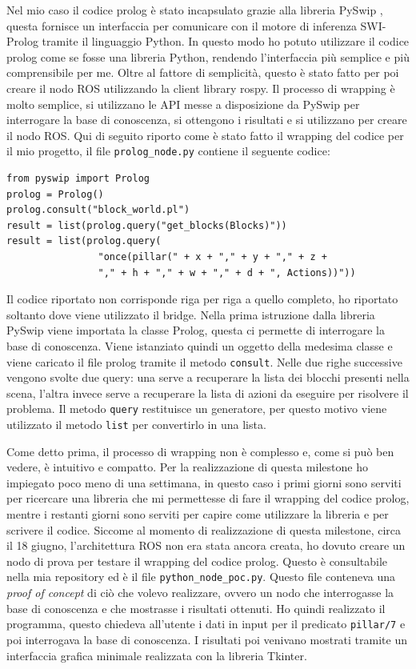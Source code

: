 Nel mio caso il codice prolog è stato incapsulato grazie alla libreria PySwip \cite{pyswip}, questa fornisce un interfaccia per comunicare con il motore di inferenza SWI-Prolog tramite il linguaggio Python.
In questo modo ho potuto utilizzare il codice prolog come se fosse una libreria Python, rendendo l'interfaccia più semplice e più comprensibile per me. 
Oltre al fattore di semplicità, questo è stato fatto per poi creare il nodo ROS utilizzando la client library rospy.
Il processo di wrapping è molto semplice, si utilizzano le API messe a disposizione da PySwip per interrogare la base di conoscenza, si ottengono i risultati e si utilizzano per creare il nodo ROS.
Qui di seguito riporto come è stato fatto il wrapping del codice per il mio progetto, il file \verb+prolog_node.py+ contiene il seguente codice:
\begin{verbatim}
from pyswip import Prolog
prolog = Prolog()
prolog.consult("block_world.pl")
result = list(prolog.query("get_blocks(Blocks)"))
result = list(prolog.query(
                "once(pillar(" + x + "," + y + "," + z + 
                "," + h + "," + w + "," + d + ", Actions))"))
\end{verbatim}
Il codice riportato non corrisponde riga per riga a quello completo, ho riportato soltanto dove viene utilizzato il bridge. Nella prima istruzione dalla libreria PySwip viene importata la classe Prolog, questa ci permette di interrogare la base di conoscenza. Viene istanziato quindi un oggetto della medesima classe e viene caricato il file prolog tramite il metodo \verb+consult+.
Nelle due righe successive vengono svolte due query: una serve a recuperare la lista dei blocchi presenti nella scena, l'altra invece serve a recuperare la lista di azioni da eseguire per risolvere il problema. Il metodo \verb+query+ restituisce un generatore, per questo motivo viene utilizzato il metodo \verb+list+ per convertirlo in una lista. 

Come detto prima, il processo di wrapping non è complesso e, come si può ben vedere, è intuitivo e compatto. 
Per la realizzazione di questa milestone ho impiegato poco meno di una settimana, in questo caso i primi giorni sono serviti per ricercare una libreria che mi permettesse di fare il wrapping del codice prolog, mentre i restanti giorni sono serviti per capire come utilizzare la libreria e per scrivere il codice.
Siccome al momento di realizzazione di questa milestone, circa il 18 giugno, l'architettura ROS non era stata ancora creata, ho dovuto creare un nodo di prova per testare il wrapping del codice prolog. 
Questo è consultabile nella mia repository ed è il file \verb+python_node_poc.py+. Questo file conteneva una \textit{proof of concept} di ciò che volevo realizzare, ovvero un nodo che interrogasse la base di conoscenza e che mostrasse i risultati ottenuti. 
Ho quindi realizzato il programma, questo chiedeva all'utente i dati in input per il predicato \verb+pillar/7+ e poi interrogava la base di conoscenza. I risultati poi venivano mostrati tramite un interfaccia grafica minimale realizzata con la libreria Tkinter.


